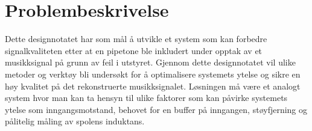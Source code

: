 \section{Problembeskrivelse}
\label{problemBeskrivelse}


Dette designnotatet har som mål å utvikle et system som kan forbedre signalkvaliteten etter at en pipetone ble inkludert under opptak av et musikksignal på grunn av feil i utstyret. Gjennom dette designnotatet vil ulike metoder og verktøy bli undersøkt for å optimalisere systemets ytelse og sikre en høy kvalitet på det rekonstruerte musikksignalet. Løsningen må være et analogt system hvor man kan ta hensyn til ulike faktorer som kan påvirke systemets ytelse som inngangsmotstand, behovet for en buffer på inngangen, støyfjerning og pålitelig måling av spolens induktans.
